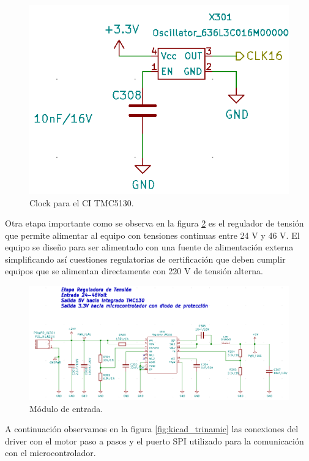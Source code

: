 \begin{figure}[h]
	\centering
	\includegraphics[width=.5\textwidth]{./Figures/kicad_clock.png}
	\caption{Clock para el CI TMC5130.}
	\label{fig:kicad_clock}
\end{figure}

Otra etapa importante como se observa en la figura \ref{fig:kicad_tension} es el regulador de tensión que permite alimentar al equipo con tensiones continuas entre 24 V y 46 V.
El equipo se diseño para ser alimentado con una fuente de alimentación externa simplificando así cuestiones regulatorias de certificación que deben cumplir equipos que se alimentan directamente con 220 V de tensión alterna.

\begin{figure}[h]
	\centering
	\includegraphics[width=1\textwidth]{./Figures/kicad_tension.png}
	\caption{Módulo de entrada.}
	\label{fig:kicad_tension}
\end{figure}
 
A continuación observamos en la figura \ref{fig:kicad_trinamic} las conexiones del driver con el motor paso a pasos y el puerto SPI utilizado para la comunicación con el microcontrolador. 
 
